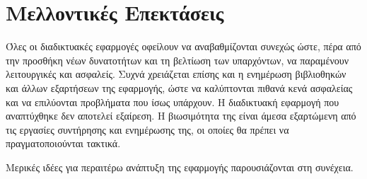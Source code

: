\section{Μελλοντικές Επεκτάσεις}
Όλες οι διαδικτυακές εφαρμογές οφείλουν να αναβαθμίζονται συνεχώς ώστε, πέρα από την προσθήκη νέων δυνατοτήτων και τη βελτίωση των υπαρχόντων, να παραμένουν λειτουργικές και ασφαλείς. Συχνά χρειάζεται επίσης και η ενημέρωση βιβλιοθηκών και άλλων εξαρτήσεων της εφαρμογής, ώστε να καλύπτονται πιθανά κενά ασφαλείας και να επιλύονται προβλήματα που ίσως υπάρχουν. Η διαδικτυακή εφαρμογή που αναπτύχθηκε δεν αποτελεί εξαίρεση. Η βιωσιμότητα της είναι άμεσα εξαρτώμενη από τις εργασίες συντήρησης και ενημέρωσης της, οι οποίες θα πρέπει να πραγματοποιούνται τακτικά.

Μερικές ιδέες για περαιτέρω ανάπτυξη της εφαρμογής παρουσιάζονται στη συνέχεια.

